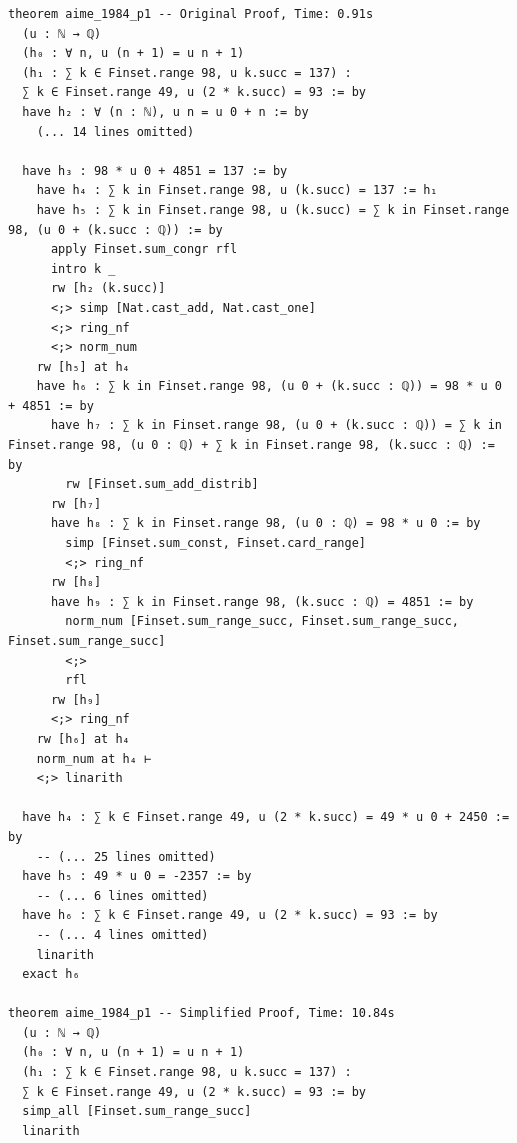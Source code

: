 \begin{tcolorbox}[colback=lightblue, boxrule=0pt, arc=5pt, outer arc=5pt, after skip=10pt plus 2pt]
\begin{lstlisting}[caption={Example of Slowdown after Simplification (orig: 0.9s, new: 10.8s)},label={lst:minif2f-slowdown-1}, captionpos=t, language=lean, breaklines=true, style=mystyle]
theorem aime_1984_p1 -- Original Proof, Time: 0.91s
  (u : ℕ → ℚ)
  (h₀ : ∀ n, u (n + 1) = u n + 1)
  (h₁ : ∑ k ∈ Finset.range 98, u k.succ = 137) :
  ∑ k ∈ Finset.range 49, u (2 * k.succ) = 93 := by
  have h₂ : ∀ (n : ℕ), u n = u 0 + n := by
    (... 14 lines omitted)

  have h₃ : 98 * u 0 + 4851 = 137 := by
    have h₄ : ∑ k in Finset.range 98, u (k.succ) = 137 := h₁
    have h₅ : ∑ k in Finset.range 98, u (k.succ) = ∑ k in Finset.range 98, (u 0 + (k.succ : ℚ)) := by
      apply Finset.sum_congr rfl
      intro k _
      rw [h₂ (k.succ)]
      <;> simp [Nat.cast_add, Nat.cast_one]
      <;> ring_nf
      <;> norm_num
    rw [h₅] at h₄
    have h₆ : ∑ k in Finset.range 98, (u 0 + (k.succ : ℚ)) = 98 * u 0 + 4851 := by
      have h₇ : ∑ k in Finset.range 98, (u 0 + (k.succ : ℚ)) = ∑ k in Finset.range 98, (u 0 : ℚ) + ∑ k in Finset.range 98, (k.succ : ℚ) := by
        rw [Finset.sum_add_distrib]
      rw [h₇]
      have h₈ : ∑ k in Finset.range 98, (u 0 : ℚ) = 98 * u 0 := by
        simp [Finset.sum_const, Finset.card_range]
        <;> ring_nf
      rw [h₈]
      have h₉ : ∑ k in Finset.range 98, (k.succ : ℚ) = 4851 := by
        norm_num [Finset.sum_range_succ, Finset.sum_range_succ, Finset.sum_range_succ]
        <;>
        rfl
      rw [h₉]
      <;> ring_nf
    rw [h₆] at h₄
    norm_num at h₄ ⊢
    <;> linarith

  have h₄ : ∑ k ∈ Finset.range 49, u (2 * k.succ) = 49 * u 0 + 2450 := by
    -- (... 25 lines omitted)
  have h₅ : 49 * u 0 = -2357 := by
    -- (... 6 lines omitted)
  have h₆ : ∑ k ∈ Finset.range 49, u (2 * k.succ) = 93 := by
    -- (... 4 lines omitted)
    linarith
  exact h₆

theorem aime_1984_p1 -- Simplified Proof, Time: 10.84s
  (u : ℕ → ℚ)
  (h₀ : ∀ n, u (n + 1) = u n + 1)
  (h₁ : ∑ k ∈ Finset.range 98, u k.succ = 137) :
  ∑ k ∈ Finset.range 49, u (2 * k.succ) = 93 := by
  simp_all [Finset.sum_range_succ]
  linarith
\end{lstlisting}
\end{tcolorbox}


